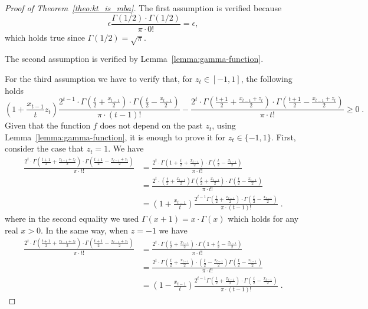 \begin{proof}[Proof of Theorem~\ref{theo:kt_is_mba}]
The first assumption is verified because
\[
\epsilon \frac{\Gamma(1/2) \cdot \Gamma(1/2)}{\pi \cdot 0!} = \epsilon ,
\]
which holds true since $\Gamma(1/2) = \sqrt{\pi}$.

The second assumption is verified by Lemma~\ref{lemma:gamma-function}.

For the third assumption we have to verify that, for $z_t \in [-1,1]$, the following holds
\[
(1+\frac{x_{t-1}}{t} z_t) \frac{2^{t-1} \cdot \Gamma \left(\frac{t}{2} + \frac{x_{t-1}}{2} \right) \cdot \Gamma \left(\frac{t}{2} - \frac{x_{t-1}}{2} \right)}{\pi \cdot (t-1)!}
- \frac{2^t \cdot \Gamma \left(\frac{t+1}{2} + \frac{x_{t-1}+z_t}{2} \right) \cdot \Gamma \left(\frac{t+1}{2} - \frac{x_{t-1}+z_t}{2} \right)}{\pi \cdot t!} \geq 0\;.
\]
Given that the function $f$ does not depend on the past $z_t$, using Lemma~\ref{lemma:gamma-function}, it is enough to prove it for $z_t \in \{-1,1\}$.
First, consider the case that $z_t=1$. We have
\begin{align*}
\frac{2^t \cdot \Gamma \left(\frac{t+1}{2} + \frac{x_{t-1}+z_t}{2} \right) \cdot \Gamma \left(\frac{t+1}{2} - \frac{x_{t-1}+z_t}{2} \right)}{\pi \cdot t!}
&= \frac{2^t \cdot \Gamma \left(1+\frac{t}{2} + \frac{x_{t-1}}{2} \right) \cdot \Gamma \left(\frac{t}{2} - \frac{x_{t-1}}{2} \right)}{\pi \cdot t!} \\
&= \frac{2^t \cdot \left(\frac{t}{2} + \frac{x_{t-1}}{2} \right) \Gamma \left(\frac{t}{2} + \frac{x_{t-1}}{2} \right) \cdot \Gamma \left(\frac{t}{2} - \frac{x_{t-1}}{2} \right)}{\pi \cdot t!} \\
&= \left(1 + \frac{x_{t-1}}{t} \right) \frac{2^{t-1} \Gamma \left(\frac{t}{2} + \frac{x_{t-1}}{2} \right) \cdot \Gamma \left(\frac{t}{2} - \frac{x_{t-1}}{2} \right)}{\pi \cdot (t-1)!} \; .
\end{align*}
where in the second equality we used $\Gamma(x+1) = x \cdot \Gamma(x)$ which holds for any
real $x > 0$. In the same way, when $z=-1$ we have
\begin{align*}
\frac{2^t \cdot \Gamma \left(\frac{t+1}{2} + \frac{x_{t-1}+z_t}{2} \right) \cdot \Gamma \left(\frac{t+1}{2} - \frac{x_{t-1}+z_t}{2} \right)}{\pi \cdot t!}
&= \frac{2^t \cdot \Gamma \left(\frac{t}{2} + \frac{x_{t-1}}{2} \right) \cdot \Gamma \left(1+\frac{t}{2} - \frac{x_{t-1}}{2} \right)}{\pi \cdot t!} \\
&= \frac{2^t \cdot \Gamma \left(\frac{t}{2} + \frac{x_{t-1}}{2} \right) \cdot \left(\frac{t}{2} - \frac{x_{t-1}}{2} \right) \Gamma \left(\frac{t}{2} - \frac{x_{t-1}}{2} \right)}{\pi \cdot t!} \\
&= \left(1 - \frac{x_{t-1}}{t} \right) \frac{2^{t-1} \Gamma \left(\frac{t}{2} + \frac{x_{t-1}}{2} \right) \cdot \Gamma \left(\frac{t}{2} - \frac{x_{t-1}}{2} \right)}{\pi \cdot (t-1)!} \; .
\end{align*}
\end{proof}


